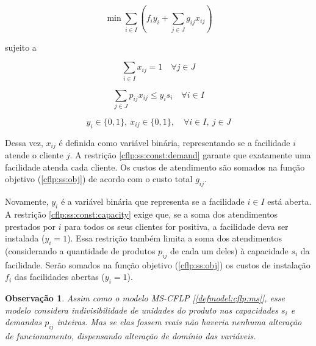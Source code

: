\documentclass[]{article}
\newtheorem{observation}{Observação}
\begin{document}
	 		\begin{equation}
	 			\label{cflp:ss:obj}		
	 			\min \sum_{i \in I} 
	 			(
	 			f_i y_i + \sum_{j \in J} g_{ij} x_{ij}
	 			)
	 		\end{equation}
 		
 			sujeito a 				
 			
 			\begin{equation}
 				\label{cflp:ss:const:demand}		
 				\sum_{i \in I} x_{ij} = 1 
 				\quad
 				\forall j \in J
 			\end{equation}
 		
 			\begin{equation}
 				\label{cflp:ss:const:capacity}		
 				\sum_{j \in J} p_{ij} x_{ij} \le y_i s_i 
 				\quad
 				\forall i \in I
 			\end{equation}
 		
 			\begin{equation}
 				\label{cflp:ss:dom:var}		
 				y_i \in \{0, 1\}, 
 				\ x_{ij} \in \{0, 1\}, 
 				\quad
 				\forall i \in I, \ j \in J
 			\end{equation}
 		
 			Dessa vez, $x_{ij}$ é definida como variável binária, representando se a facilidade $i$ atende o cliente $j$. 
 			A restrição \ref{cflp:ss:const:demand} garante que exatamente uma facilidade atenda cada cliente.
 			Os custos de atendimento são somados na função objetivo (\ref{cflp:ss:obj}) de acordo com o custo total $g_{ij}$. 		
 			
 			Novamente, $y_i$ é a variável binária que representa se a facilidade $i \in I$ está aberta.
 			A restrição \ref{cflp:ss:const:capacity} exige que, se a soma dos atendimentos prestados por $i$ para todos os seus clientes for positiva, a facilidade deva ser instalada ($y_i = 1$). 
 			Essa restrição também limita a soma dos atendimentos (considerando a quantidade de produtos $p_{ij}$ de cada um deles) à capacidade $s_i$ da facilidade.
 			Serão somados na função objetivo (\ref{cflp:ss:obj}) os custos de instalação $f_i$ das facilidades abertas ($y_i = 1$).
 			
 			\begin{observation} \label{cflp:ss:obs:int}
 				Assim como o modelo MS-CFLP [\ref{defmodel:cflp:ms}], esse modelo considera indivisibilidade de unidades do produto nas capacidades $s_i$ e demandas $p_{ij}$ inteiras. 
 				Mas se elas fossem reais não haveria nenhuma alteração de funcionamento, dispensando alteração de domínio das variáveis.
 			\end{observation}
 		
\end{document}
